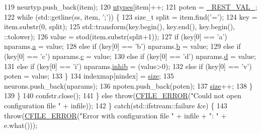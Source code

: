 \begin{DoxyCode}
119                     neurtyp.push\_back(item);
120                     \hyperlink{classSimulation_a445d67187d6cc08c4c098ca498ee87d7}{ntypes}[item]++;
121                     poten = \hyperlink{globals_8h_aeef69e4cb5a7aa8b2dc851c334613c2e}{\_REST\_VAL\_};
122                     \textcolor{keywordflow}{while} (std::getline(ss, item, \textcolor{charliteral}{';'})) \{
123                         \textcolor{keywordtype}{size\_t} split = item.find(\textcolor{charliteral}{'='});
124                         key = item.substr(0, split);
125                         std::transform(key.begin(), key.end(), key.begin(), ::tolower);
126                         value = stod(item.substr(split+1));
127                         \textcolor{keywordflow}{if}      (key[0] == \textcolor{charliteral}{'a'}) nparams.\hyperlink{structNeuronParams_a359703733f5e70bbd67d019e45a3bc85}{a} = value;
128                         \textcolor{keywordflow}{else} \textcolor{keywordflow}{if} (key[0] == \textcolor{charliteral}{'b'}) nparams.\hyperlink{structNeuronParams_abd1bd37179d8efa115a8749f9252f77d}{b} = value;
129                         \textcolor{keywordflow}{else} \textcolor{keywordflow}{if} (key[0] == \textcolor{charliteral}{'c'}) nparams.\hyperlink{structNeuronParams_a5df2ced2526eb84af2c8d2d34d9bfd93}{c} = value;
130                         \textcolor{keywordflow}{else} \textcolor{keywordflow}{if} (key[0] == \textcolor{charliteral}{'d'}) nparams.\hyperlink{structNeuronParams_af2bd3bad3bc5532186cdc8d056a10cfb}{d} = value;
131                         \textcolor{keywordflow}{else} \textcolor{keywordflow}{if} (key[0] == \textcolor{charliteral}{'i'}) nparams.\hyperlink{structNeuronParams_a751856d77a821cbd361b774d8653bbe6}{inhib} = (value>0);
132                         \textcolor{keywordflow}{else} \textcolor{keywordflow}{if} (key[0] == \textcolor{charliteral}{'v'}) poten = value;
133                     \}
134                     indexmap[nindex] = \hyperlink{classSimulation_ae198f9ac020ed6bc6ebbd608ab3f959d}{size};
135                     neurons.push\_back(nparams);
136                     npoten.push\_back(poten);
137                     \hyperlink{classSimulation_ae198f9ac020ed6bc6ebbd608ab3f959d}{size}++;
138                 \}
139             \}
140             confstr.close();
141         \} \textcolor{keywordflow}{else} \textcolor{keywordflow}{throw}(\hyperlink{classCFILE__ERROR}{CFILE\_ERROR}(\textcolor{stringliteral}{"Could not open configuration file "} + infile));
142     \} \textcolor{keywordflow}{catch}(std::ifstream::failure &e) \{
143         \textcolor{keywordflow}{throw}(\hyperlink{classCFILE__ERROR}{CFILE\_ERROR}(\textcolor{stringliteral}{"Error with configuration file "} + infile + \textcolor{stringliteral}{": "} + e.what()));

\end{DoxyCode}
